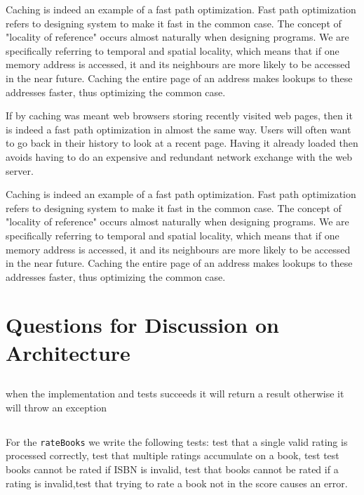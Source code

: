 \documentclass[11pt]{article}
\begin{document}
\begin{enumerate}
    Caching is indeed an example of a fast path optimization. Fast path optimization
    refers to designing system to make it fast in the common case. The concept of
    "locality of reference" occurs almost naturally when designing programs.
    We are specifically referring to temporal and spatial locality, which means that
    if one memory address is accessed, it and its neighbours are more likely to be
    accessed in the near future. Caching the entire page of an address makes lookups
    to these addresses faster, thus optimizing the common case.

    If by caching was meant web browsers storing recently visited web pages,
    then it is indeed a fast path optimization in almost the same way. Users
    will often want to go back in their history to look at a recent page. Having
    it already loaded then avoids having to do an expensive and redundant
    network exchange with the web server.
\end{enumerate}


Caching is indeed an example of a fast path optimization. Fast path optimization
refers to designing system to make it fast in the common case. The concept of
"locality of reference" occurs almost naturally when designing programs.
We are specifically referring to temporal and spatial locality, which means that
if one memory address is accessed, it and its neighbours are more likely to be
accessed in the near future. Caching the entire page of an address makes lookups
to these addresses faster, thus optimizing the common case.

\section{Questions for Discussion on Architecture}
\subsection{}
when the implementation and tests succeeds it will return a result otherwise it will throw an exception

\subsection{}
For the \texttt{rateBooks} we write the following tests: test that a single valid rating is processed correctly, test that multiple ratings accumulate on a book, test test books cannot be rated if ISBN is invalid, test that books cannot be rated if a rating is invalid,test that trying to rate a book not in the score causes an error.
\end{document}
